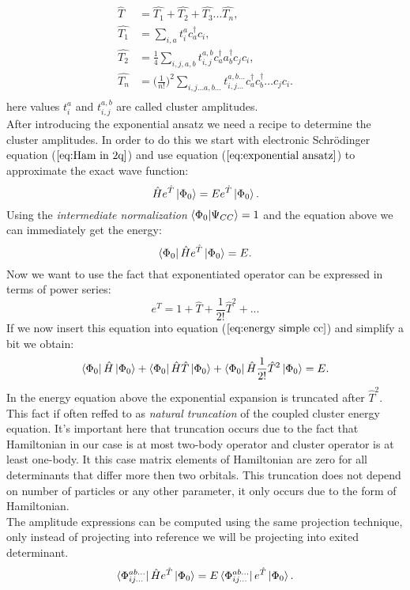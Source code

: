 \documentclass[twoside,english]{uiofysmaster}
\theoremstyle{definition}
\begin{document}
\begin{align} \label{eq:T}
\hat{T}   &= \hat{T_1}+ \hat{T_2}+ \hat{T_3}...\hat{T_n},  \\
\hat{T_1} &= \sum_{i,a} t_i^a c_a^\dagger c_i, \label{eq:T1}\\
\hat{T_2} &= \frac{1}{4} \sum_{i,j,a,b} t_{i,j}^{a,b} c_a^\dagger a_b^\dagger c_j c_i,\\
\hat{T_n} &= \bigg(\frac{1}{n!}\bigg)^2 \sum_{i,j \dots a,b\dots } t_{i,j\dots}^{a,b\dots}  c_a^\dagger c_b^\dagger \dots c_j c_i.\\
\end{align}
here values $t_i^a $ and $t_{i,j}^{a,b}$ are called cluster amplitudes. \\
After introducing the exponential ansatz we need a recipe to determine the cluster amplitudes. In order to do this we start with electronic Schr\"{o}dinger equation ($\ref{eq:Ham in 2q}$) and use equation ($\ref{eq:exponential ansatz}$) to approximate the exact wave function:
\begin{equation}
	\hat{H}e^{\hat{T}}\ket{\Phi_0}=Ee^{\hat{T}}\ket{\Phi_0}.
\end{equation}
Using the \textit{intermediate normalization} $\braket{\Phi_0|\Psi_{CC}}=1$ and  the equation above we can immediately get the energy:
\begin{equation}\label{eq:energy simple cc}
\bra{\Phi_0}\hat{H}e^{\hat{T}}\ket{\Phi_0}=E.
\end{equation}
Now we want to use the fact that exponentiated operator can be expressed in terms of power series:
 \begin{equation}
 e^{\hat{T}}= 1+ \hat{T}+\frac{1}{2!}\hat{T}^2+ ...
 \end{equation}
If we now insert this equation into equation ($\ref{eq:energy simple cc}$) and simplify a bit we obtain:
\begin{equation}
 \bra{\Phi_0}\hat{H}\ket{\Phi_0} +  \bra{\Phi_0}\hat{H}\hat{T}\ket{\Phi_0} +\bra{\Phi_0}\hat{H}\frac{1}{2!}\hat{T}^2\ket{\Phi_0}  = E.
\end{equation}
In the energy equation above the exponential expansion is truncated after $\hat{T}^2$. This fact if often reffed to as \textit{natural truncation} of the coupled cluster energy equation. It's important here that truncation occurs due to the fact that Hamiltonian in our case is at most two-body operator and cluster operator is at least one-body. It this case matrix elements of Hamiltonian are zero for all determinants that differ more then two orbitals. This truncation does not depend on number of particles or any other parameter, it only occurs due to the form of Hamiltonian. \\
The amplitude expressions can be computed using the same projection technique, only instead of projecting into reference we will be projecting into exited determinant. 
\begin{equation}\label{eq:ampl simple}
\bra{\Phi_{ij...}^{ab...}}\hat{H} e^{\hat{T}}\ket{\Phi_0} = E\bra{\Phi_{ij...}^{ab...}} e^{\hat{T}}\ket{\Phi_0}.
\end{equation}
\end{document}

